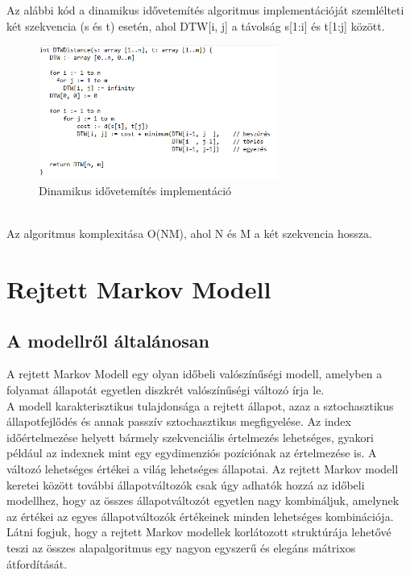 \documentclass[a4paper,12pt]{paper}
\begin{document}
Az alábbi kód a dinamikus idővetemítés algoritmus implementációját szemlélteti két szekvencia (s és t) esetén, ahol DTW[i, j] a távolság s[1:i] és t[1:j] között.
\begin{figure}[h]
	\centering
	\includegraphics[width=0.7\textwidth]{dtw}
	\caption{Dinamikus idővetemítés implementáció}
\end{figure}
\\Az algoritmus komplexitása O(NM), ahol N és M a két szekvencia hossza.

\section{Rejtett Markov Modell}
\subsection{A modellről általánosan}
A rejtett Markov Modell egy olyan időbeli valószínűségi modell, amelyben a folyamat állapotát egyetlen diszkrét valószínűségi változó írja le.
\\A modell karakterisztikus tulajdonsága a rejtett állapot, azaz a sztochasztikus állapotfejlődés és annak passzív sztochasztikus megfigyelése. Az index időértelmezése helyett bármely szekvenciális értelmezés lehetséges, gyakori például az indexnek mint egy egydimenziós pozíciónak az értelmezése is. A változó lehetséges értékei a világ lehetséges állapotai. Az rejtett Markov modell keretei között további állapotváltozók csak úgy adhatók hozzá az időbeli modellhez, hogy az összes állapotváltozót egyetlen nagy kombináljuk, amelynek az értékei az egyes állapotváltozók értékeinek minden lehetséges kombinációja. Látni fogjuk, hogy a rejtett Markov modellek korlátozott struktúrája lehetővé teszi az összes alapalgoritmus egy nagyon egyszerű és elegáns mátrixos átfordítását.
\end{document}
